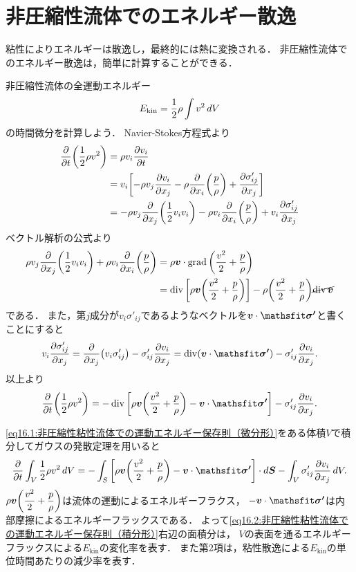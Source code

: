 \section{非圧縮性流体でのエネルギー散逸}\label{sec:16}

粘性によりエネルギーは散逸し，最終的には熱に変換される．
非圧縮性流体でのエネルギー散逸は，簡単に計算することができる．



非圧縮性流体の全運動エネルギー
\[
    E_\mathrm{kin} = \frac{1}{2} \rho \int v^2 \, dV
\]
の時間微分を計算しよう．
Navier-Stokes方程式より
\begin{align*}
    \pdv{t} \pqty{\frac{1}{2}\rho v^2} &= \rho v_i \pdv{v_i}{t} \\
    &= v_i \bqty{ -\rho v_j\pdv{v_i}{x_j} - \rho\pdv{x_i} \pqty{\frac{p}{\rho}} + \pdv{\sigma'_{ij}}{x_j} } \\
    &= -\rho v_j \pdv{x_j} \pqty{\frac{1}{2}v_iv_i} - \rho v_i \pdv{x_i} \pqty{\frac{p}{\rho}} + v_i \pdv{\sigma'_{ij}}{x_j}
\end{align*}
ベクトル解析の公式より
\begin{align*}
    \rho v_j \pdv{x_j} \pqty{\frac{1}{2}v_iv_i} + \rho v_i \pdv{x_i} \pqty{\frac{p}{\rho}}
    &= \rho\v \cdot \Grad \pqty{ \frac{v^2}{2} + \frac{p}{\rho} } \\
    &= \Div \bqty{ \rho\v \pqty{ \frac{v^2}{2} + \frac{p}{\rho} } } - \rho \pqty{ \frac{v^2}{2} + \frac{p}{\rho} } \cancel{\Div\v}
\end{align*}
である．
また，第$j$成分が$v_i\sigma'_{ij}$であるようなベクトルを$\v\cdot\mat{\sigma'}$と書くことにすると
\[
    v_i \pdv{\sigma'_{ij}}{x_j} = \pdv{x_j} (v_i \sigma'_{ij}) - \sigma'_{ij} \pdv{v_i}{x_j}
    = \Div(\v\cdot\mat{\sigma'}) - \sigma'_{ij} \pdv{v_i}{x_j} .
\]
以上より
\begin{equation}\label{eq16.1:非圧縮性粘性流体での運動エネルギー保存則（微分形）}
    \pdv{t} \pqty{\frac{1}{2}\rho v^2} 
    = -\Div\bqty{ \rho\v \pqty{ \frac{v^2}{2} + \frac{p}{\rho} } - \v\cdot\mat{\sigma'} } - \sigma'_{ij} \pdv{v_i}{x_j} .
\end{equation}


\eqref{eq16.1:非圧縮性粘性流体での運動エネルギー保存則（微分形）}をある体積$V$で積分してガウスの発散定理を用いると
\begin{equation}\label{eq16.2:非圧縮性粘性流体での運動エネルギー保存則（積分形）}
    \pdv{t} \int_V \frac{1}{2}\rho v^2 \dV
    = -\int_S \bqty{ \rho\v \pqty{ \frac{v^2}{2} + \frac{p}{\rho} } - \v\cdot\mat{\sigma'} } \cdot \dS - \int_V \sigma'_{ij} \pdv{v_i}{x_j} \dV .
\end{equation}
$\rho\v \pqty{ \dfrac{v^2}{2} + \dfrac{p}{\rho} }$は流体の運動によるエネルギーフラクス，
$-\v\cdot\mat{\sigma'}$は内部摩擦によるエネルギーフラックスである．
よって\eqref{eq16.2:非圧縮性粘性流体での運動エネルギー保存則（積分形）}右辺の面積分は，
$V$の表面を通るエネルギーフラックスによる$E_\mathrm{kin}$の変化率を表す．
また第2項は，粘性散逸による$E_\mathrm{kin}$の単位時間あたりの減少率を表す．



